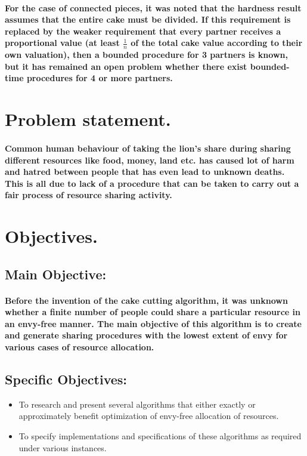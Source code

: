 \documentclass[12pt]{report}
\begin{document}
		\paragraph{For the case of connected pieces, it was noted that the hardness result assumes that the entire cake must be divided. If this requirement is replaced by the weaker requirement that every partner receives a proportional value (at least $\frac{1}{n}$ of the total cake value according to their own valuation), then a bounded procedure for 3 partners is known, but it has remained an open problem whether there exist bounded-time procedures for 4 or more partners.
		}
		\section{Problem statement.}
		\paragraph{Common human behaviour of taking the lion's share during sharing different resources like food, money, land etc. has caused lot of harm and hatred between people that has even lead to unknown deaths. This is all due to lack of a procedure that can be taken to carry out a fair process of resource sharing activity. }
		
		\section{Objectives.}
		\subsection{Main Objective:}
		\paragraph{Before the invention of the cake cutting algorithm, it was unknown whether a finite number of people could share a particular resource in an envy-free manner. The main objective of this algorithm is to create and generate sharing procedures with the lowest extent of envy for various cases of resource allocation.}
		\subsection{Specific Objectives:}
		\begin{itemize}
			\item To research and present several algorithms that either exactly or approximately benefit optimization of envy-free allocation of resources.
			\item To specify implementations and specifications of these algorithms as required under various instances.
		\end{itemize}
\end{document}
